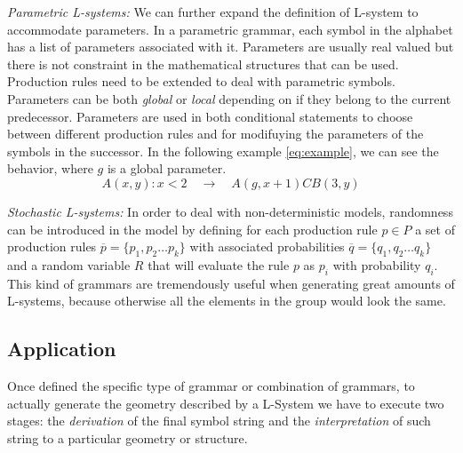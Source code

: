 \documentclass[letterpaper,twoside,11pt]{article}
\begin{document}
\begin{multicols}{2}
\emph{Parametric L-systems:} We can further expand the definition of L-system to accommodate parameters. In a parametric grammar, each symbol in the alphabet has a list of parameters associated with it. Parameters are usually real valued but there is not constraint in the mathematical structures that can be used. Production rules need to be extended to deal with parametric symbols. Parameters can be both \emph{global} or \emph{local} depending on if they belong to the current predecessor. Parameters are used in both conditional statements to choose between different production rules and for modifuying the parameters of the symbols in the successor. In the following example \eqref{eq:example}, we can see the behavior, where $g$ is a global parameter.
\begin{equation}
\label{eq:example}
	A(x,y) : x < 2 \quad\rightarrow\quad A(g,x+1) C B(3,y)
\end{equation}

\emph{Stochastic L-systems:} In order to deal with non-deterministic models, randomness can be introduced in the model by defining for each production rule $p \in P$ a set of production rules $\overline{p} = \{p_1,p_2\ldots p_k\}$ with associated probabilities $\overline{q} = \{q_1,q_2\ldots q_k\}$ and a random variable $R$ that will evaluate the rule $p$ as $p_i$ with probability $q_i$. This kind of grammars are tremendously useful when generating great amounts of L-systems, because otherwise all the elements in the group would look the same.


\subsection{Application} %
\label{sub:application}

Once defined the specific type of grammar or combination of grammars, to actually generate the geometry described by a L-System we have to execute two stages: the \emph{derivation} of the final symbol string and the \emph{interpretation} of such string to a particular geometry or structure.


\end{multicols}
\end{document}
